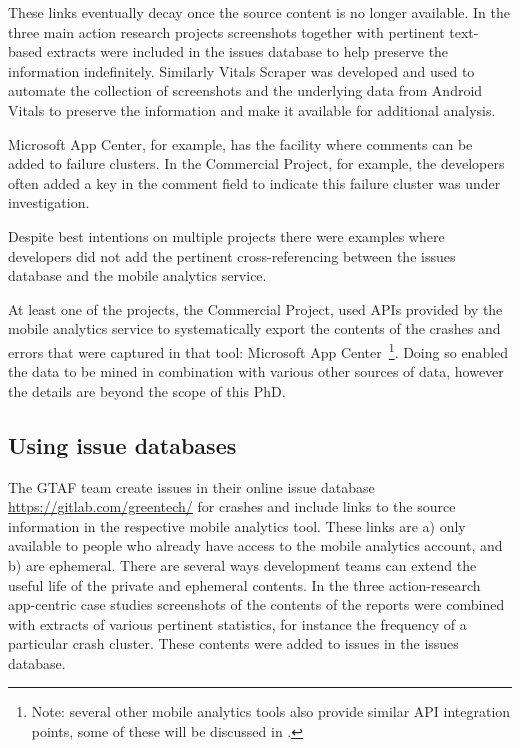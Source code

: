 These links eventually decay once the source content is no longer available. In the three main action research projects screenshots together with pertinent text-based extracts were included in the issues database to help preserve the information indefinitely. Similarly Vitals Scraper was developed and used to automate the collection of screenshots and the underlying data from Android Vitals to preserve the information and make it available for additional analysis.

Microsoft App Center, for example, has the facility where comments can be added to failure clusters. In the Commercial Project, for example, the developers often added a key in the comment field to indicate this failure cluster was under investigation. 

Despite best intentions on multiple projects there were examples where developers did not add the pertinent cross-referencing between the issues database and the mobile analytics service.

At least one of the projects, the Commercial Project, used APIs provided by the mobile analytics service to systematically export the contents of the crashes and errors that were captured in that tool: Microsoft App Center~\footnote{Note: several other mobile analytics tools also provide similar API integration points, some of these will be discussed in .}. Doing so enabled the data to be mined in combination with various other sources of data, however the details are beyond the scope of this PhD.

\subsection{Using issue databases}
The GTAF team create issues in their online issue database \url{https://gitlab.com/greentech/} for crashes and include links to the source information in the respective mobile analytics tool. These links are a) only available to people who already have access to the mobile analytics account, and b) are ephemeral. There are several ways development teams can extend the useful life of the private and ephemeral contents. In the three action-research app-centric case studies screenshots of the contents of the reports were combined with extracts of various pertinent statistics, for instance the frequency of a particular crash cluster. These contents were added to issues in the issues database. 

